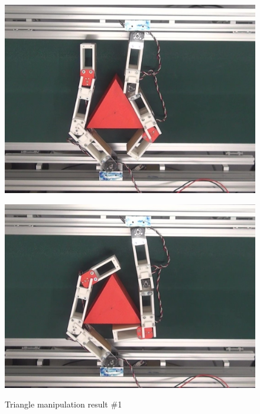 \documentclass[a4paper,twoside,12pt,papersize, dvipdfmx]{iirthesis}
\begin{document}
\begin{figure}[hbt]
\begin{minipage}{0.249\hsize}
\includegraphics[width=0.98\hsize]{fig/4-manipulation-result/Triangle/1-3.jpg}
\subcaption{}\label{}
\end{minipage}\hfill
\begin{minipage}{0.249\hsize}
\centering
\includegraphics[width=0.98\hsize]{fig/4-manipulation-result/Triangle/1-4.jpg}
\subcaption{}\label{}
\end{minipage}
\caption{Triangle manipulation result \#1}\label{fig::result::trim1}
\end{figure}
\end{document}
